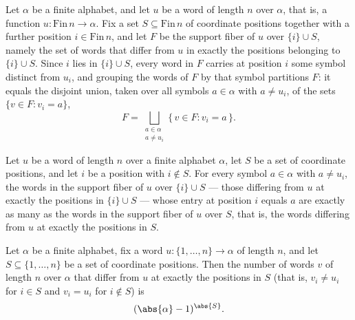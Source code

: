 \begin{lemma}
\label{CommunicationComplexity.choices_partition_supportFiber}
\leanok
{}
Let $\alpha$ be a finite alphabet, and let $u$ be a word of length $n$ over $\alpha$,
that is, a function $u \colon \mathrm{Fin}\,n \to \alpha$. Fix a set $S \subseteq
\mathrm{Fin}\,n$ of coordinate positions together with a further position $i \in
\mathrm{Fin}\,n$, and let $F$ be the support fiber of $u$ over $\{i\} \cup S$, namely
the set of words that differ from $u$ in exactly the positions belonging to $\{i\} \cup
S$. Since $i$ lies in $\{i\} \cup S$, every word in $F$ carries at position $i$ some
symbol distinct from $u_i$, and grouping the words of $F$ by that symbol partitions $F$:
it equals the disjoint union, taken over all symbols $a \in \alpha$ with $a \ne u_i$, of
the sets $\{v \in F : v_i = a\}$,
\[
  F = \bigsqcup_{\substack{a \in \alpha \\ a \ne u_i}} \{\, v \in F : v_i = a \,\}.
\]
\end{lemma}

\begin{lemma}
\label{CommunicationComplexity.piece_card}
\leanok
{}
Let $u$ be a word of length $n$ over a finite alphabet $\alpha$, let $S$ be a set of
coordinate positions, and let $i$ be a position with $i \notin S$. For every symbol $a
\in \alpha$ with $a \ne u_i$, the words in the support fiber of $u$ over $\{i\} \cup S$
— those differing from $u$ at exactly the positions in $\{i\} \cup S$ — whose entry at
position $i$ equals $a$ are exactly as many as the words in the support fiber of $u$
over $S$, that is, the words differing from $u$ at exactly the positions in $S$.
\end{lemma}

\begin{lemma}
\label{CommunicationComplexity.card_supportFiber}
\leanok
{}
Let $\alpha$ be a finite alphabet, fix a word $u \colon \{1,\dots,n\} \to \alpha$ of
length $n$, and let $S \subseteq \{1,\dots,n\}$ be a set of coordinate positions. Then
the number of words $v$ of length $n$ over $\alpha$ that differ from $u$ at exactly the
positions in $S$ (that is, $v_i \ne u_i$ for $i \in S$ and $v_i = u_i$ for $i \notin S$)
is
\[
  (\abs{\alpha} - 1)^{\abs{S}}.
\]
\end{lemma}

